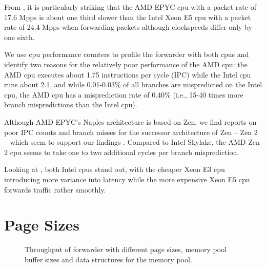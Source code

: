 From , it is particularly striking that the
AMD EPYC \ac{cpu} with a packet rate of 17.6 Mpps is about one third slower than
the Intel Xeon E5 \ac{cpu} with a packet rate of 24.4 Mpps when forwarding
packets although clockspeeds differ only by one sixth.

We use \ac{cpu} performance counters to profile the forwarder with both
\acp{cpu} and identify two reasons for the relatively poor performance of the
AMD \ac{cpu}: the AMD \ac{cpu} executes about 1.75 instructions per cycle (IPC)
while the Intel \ac{cpu} runs about 2.1, and while 0.01-0.03\% of all branches
are mispredicted on the Intel \ac{cpu}, the AMD \ac{cpu} has a misprediction
rate of 0.40\% (i.e., 15-40 times more branch mispredictions than the Intel
\ac{cpu}).

Although AMD EPYC's Naples architecture is based on Zen, we find reports on poor
IPC counts and branch misses for the successor architecture of Zen -- Zen 2 --
which seem to support our findings \cite{lemire2019instructions,
lemire2019mispredictions}. Compared to Intel Skylake, the AMD Zen 2 \ac{cpu}
seems to take one to two additional cycles per branch misprediction.

Looking at , both Intel \acp{cpu} stand out,
with the cheaper Xeon E3 \ac{cpu} introducing more variance into latency while
the more expensive Xeon E5 \ac{cpu} forwards traffic rather smoothly.


\section{Page Sizes}
\label{sec:page_sizes}

\begin{figure}[!b]
	\centering
    \par
    \par

    \caption{Throughput of forwarder with different page sizes, memory pool
    buffer sizes and data structures for the memory pool.}
	\label{fig:page-size-throughput}
\end{figure}

